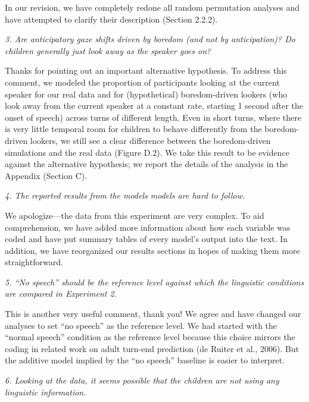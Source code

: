 \documentclass[11pt,a4paper]{letter} %
\begin{document}
\begin{letter}{}
\noindent In our revision, we have completely redone all random permutation analyses and have attempted to clarify their description (Section 2.2.2).

\smallskip

\noindent \textit{3. Are anticipatory gaze shifts driven by boredom (and not by anticipation)? Do children generally just look away as the speaker goes on?}

\noindent Thanks for pointing out an important alternative hypothesis. To address this comment, we modeled the proportion of participants looking at the current speaker for our real data and for (hypothetical) boredom-driven lookers (who look away from the current speaker at a constant rate, starting 1 second after the onset of speech) across turns of different length. Even in short turns, where there is very little temporal room for children to behave differently from the boredom-driven lookers, we still see a clear difference between the boredom-driven simulations and the real data (Figure D.2). We take this result to be evidence against the alternative hypothesis; we report the details of the analysis in the Appendix (Section C).

\smallskip

\noindent \textit{4. The reported results from the models models are hard to follow.}

\noindent We apologize---the data from this experiment are very complex. To aid comprehension, we have added more information about how each variable was coded and have put summary tables of every model's output into the text. In addition, we have reorganized our results sections in hopes of making them more straightforward. 

\smallskip

\noindent \textit{5. ``No speech'' should be the reference level against which the linguistic conditions are compared in Experiment 2.}

\noindent This is another very useful comment, thank you! We agree and have changed our analyses to set ``no speech'' as the reference level. We had started with the ``normal speech'' condition as the reference level because this choice mirrors the coding in related work on adult turn-end prediction (de Ruiter et al., 2006). But the additive model implied by the ``no speech'' baseline is easier to interpret. 

\noindent \textit{6. Looking at the data, it seems possible that the children are not using any linguistic information.}


\end{letter}
\end{document}
